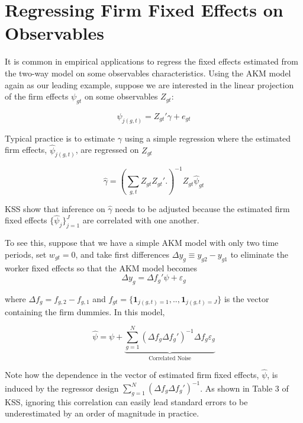 \documentclass[11pt]{article}
\begin{document}
    \hypertarget{regressing-firm-fixed-effects-on-observables}{%
\section{Regressing Firm Fixed Effects on
Observables}\label{regressing-firm-fixed-effects-on-observables}}
\label{sec:lincom}
It is common in empirical applications to regress the fixed effects
estimated from the two-way model on some observables characteristics.
Using the AKM model again as our leading example, suppose we are
interested in the linear projection of the firm effects \(\psi_{gt}\)
on some observables \(Z_{gt}\):

\begin{equation}
\psi_{j(g,t)}=Z_{gt}'\gamma+e_{gt}
\end{equation}

Typical practice is to estimate \(\gamma\) using a simple regression
where the estimated firm effects, \(\hat{\psi}_{j(g,t)}\), are regressed
on \(Z_{gt}\)

\begin{equation}
\hat{\gamma}=\left(\sum_{g,t}Z_{gt}Z_{gt}'.
\right)^{-1}Z_{gt}\hat{\psi}_{gt}
\end{equation}

KSS show that inference on \(\hat{\gamma}\) needs to be adjusted because the estimated firm fixed effects $\{\hat{\psi}_{j}\}_{j=1}^{J}$ are correlated with one another.

To see this, suppose that we have a simple AKM model with only two time
periods, set \(w_{gt}=0\), and take first differences
\(\Delta y_{g}\equiv y_{g2}-y_{g1}\) to eliminate the worker fixed
effects so that the AKM model becomes \begin{equation}
\Delta y_{g}=\Delta f_{g}'\psi+\varepsilon_{g}
\end{equation}

where \(\Delta f_{g}=f_{g,2}-f_{g,1}\) and
\(f_{gt}=\{\mathbf{1}_{j(g,t)=1},..,\mathbf{1}_{j(g,t)=J}\}\) is the
vector containing the firm dummies. In this model,

\begin{equation}
\hat{\psi}=\psi+\underbrace{\sum_{g=1}^{N}(\Delta f_{g}\Delta f_{g}')^{-1}\Delta f_{g}\varepsilon_{g}}_{\text{Correlated Noise}}
\end{equation}

Note how the dependence in the vector of estimated firm fixed effects,
\(\hat{\psi}\), is induced by the regressor design
\(\sum_{g=1}^{N}(\Delta f_{g}\Delta f_{g}')^{-1}\). As shown in
Table 3 of KSS, ignoring this correlation can easily lead standard
errors to be underestimated by an order of magnitude in practice.
\end{document}
